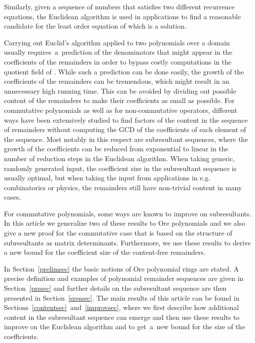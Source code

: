 \documentclass[3p,11pt,preprint]{elsarticle}
\begin{document}
Similarly, given a sequence of numbers  that satisfies two different recurrence equations, the Euclidean algorithm is used in applications to find a reasonable candidate for the least order equation of which  is a solution.

Carrying out Euclid's algorithm applied to two polynomials over a domain  usually requires~a~prediction of the denominators that might appear in the coefficients of the remainders in order to bypass costly computations in the quotient field of . While such a prediction can be done easily, the growth of the coefficients of the remainders can be tremendous, which might result in an unnecessary high running time. This can be avoided by dividing out possible content of the remainders to make their coefficients as small as possible. For commutative polynomials as well as for non-commutative operators, different ways have been extensively studied to find factors of the content in the sequence of remainders without computing the GCD of the coefficients of each element of the sequence. Most notably in this respect are subresultant sequences, where the growth of the coefficients can be reduced from exponential to linear in the number of reduction steps in the Euclidean algorithm. When taking generic, randomly 
generated input, the coefficient size in the subresultant sequence is usually optimal, but when taking the input from applications in e.g. combinatorics or physics, the remainders still have non-trivial content in many cases. 

For commutative polynomials, some ways are known to improve on subresultants. In this article we generalize two of these results to Ore polynomials and we also give a new proof for the commutative case that is based on the structure of subresultants as matrix determinants. Furthermore, we use these results to derive a new bound for the coefficient size of the content-free remainders.

In Section~\ref{prelimsec} the basic notions of Ore polynomial rings are stated. A precise definition and examples of polynomial remainder sequences are given in Section~\ref{prssec} and further details on the subresultant sequence are then presented in Section~\ref{sressec}. The main results of this article can be found in Sections~\ref{contentsec}~and~\ref{improvsec}, where we first describe how additional content in the subresultant sequence can emerge and then use these results to improve on the Euclidean algorithm and to get~a~new bound for the size of the coefficients.
\end{document}
